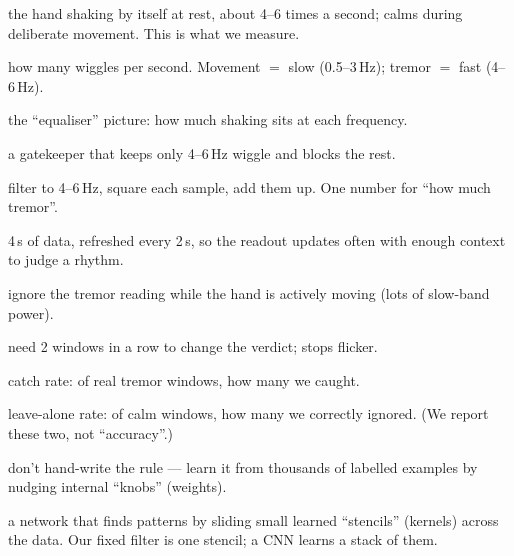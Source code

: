 \documentclass[11pt]{article}
\begin{document}
\begin{tcolorbox}[enhanced, colback=white, colframe=teal, boxrule=1pt, arc=3pt,
   left=12pt, right=12pt, top=9pt, bottom=9pt]
\begin{description}[leftmargin=9.2em, style=nextline, font=\bfseries\color{teal}]
  \item[Resting tremor] the hand shaking by itself at rest, about 4--6 times a
        second; calms during deliberate movement. This is what we measure.
  \item[Frequency (Hz)] how many wiggles per second. Movement $=$ slow
        (0.5--3\,Hz); tremor $=$ fast (4--6\,Hz).
  \item[Spectrum] the ``equaliser'' picture: how much shaking sits at each
        frequency.
  \item[Band-pass filter] a gatekeeper that keeps only 4--6\,Hz wiggle and
        blocks the rest.
  \item[Tremor power] filter to 4--6\,Hz, square each sample, add them up. One
        number for ``how much tremor''.
  \item[Window] 4\,s of data, refreshed every 2\,s, so the readout updates often
        with enough context to judge a rhythm.
  \item[Rest gate] ignore the tremor reading while the hand is actively moving
        (lots of slow-band power).
  \item[Debounce] need 2 windows in a row to change the verdict; stops flicker.
  \item[Sensitivity] catch rate: of real tremor windows, how many we caught.
  \item[Specificity] leave-alone rate: of calm windows, how many we correctly
        ignored. (We report these two, not ``accuracy''.)
  \item[Machine learning] don't hand-write the rule --- learn it from thousands
        of labelled examples by nudging internal ``knobs'' (weights).
  \item[CNN] a network that finds patterns by sliding small learned ``stencils''
        (kernels) across the data. Our fixed filter is one stencil; a CNN learns
        a stack of them.
\end{description}
\end{tcolorbox}

\vfill
{}
\end{document}
